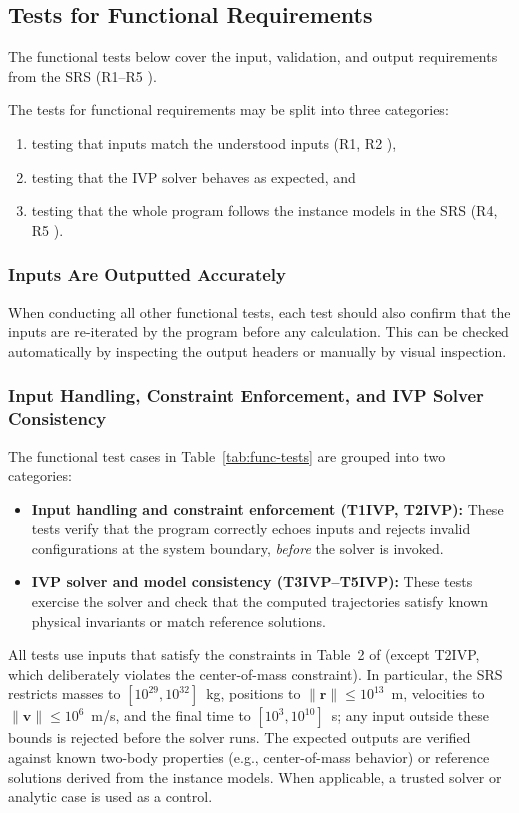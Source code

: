 \documentclass[12pt, titlepage]{article}
\begin{document}
\subsection{Tests for Functional Requirements}\label{SystemTests}

The functional tests below cover the input, validation, and output requirements
from the SRS (R1--R5 \citep{SRS}).

The tests for functional requirements may be split into three categories:
\begin{enumerate}
  \item testing that inputs match the understood inputs (R1, R2 \citep{SRS}),
  \item testing that the IVP solver behaves as expected, and
  \item testing that the whole program follows the instance models in the SRS
  (R4, R5 \citep{SRS}).
\end{enumerate}

\subsubsection{Inputs Are Outputted Accurately}
When conducting all other functional tests, each test should also confirm that
the inputs are re-iterated by the program before any calculation. This can be
checked automatically by inspecting the output headers or manually by visual
inspection.

\subsubsection{Input Handling, Constraint Enforcement, and IVP Solver
Consistency}
The functional test cases in Table~\ref{tab:func-tests} are grouped into two
categories:
\begin{itemize}
  \item \textbf{Input handling and constraint enforcement (T1IVP, T2IVP):}
  These tests verify that the program correctly echoes inputs and rejects
  invalid configurations at the system boundary, \emph{before} the solver is
  invoked.
  \item \textbf{IVP solver and model consistency (T3IVP--T5IVP):} These tests
  exercise the solver and check that the computed trajectories satisfy known
  physical invariants or match reference solutions.
\end{itemize}

All tests use inputs that satisfy the constraints in Table~2 of \citep{SRS}
(except T2IVP, which deliberately violates the center-of-mass constraint). In
particular, the SRS restricts masses to $[10^{29}, 10^{32}]$~kg, positions to
$\lVert\mathbf{r}\rVert \le 10^{13}$~m, velocities to
$\lVert\mathbf{v}\rVert \le 10^{6}$~m/s, and the final time to
$[10^{3}, 10^{10}]$~s; any input outside these bounds is rejected before the
solver runs. The expected outputs are verified against known two-body properties
(e.g., center-of-mass behavior) or reference solutions derived from the instance
models. When applicable, a trusted solver or analytic case is used as a
control.
\end{document}
